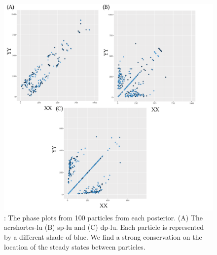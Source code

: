 \begin{figure}
	\begin{center}
		\includegraphics[width=\textwidth]{../../chapters/chapterStabilityFinder/images/LU-234-phase-all.png}
		\caption[Phase plots of multistable switches]{ \label{fig:lu_234_phase}: The phase plots from 100 particles from each posterior. (A) The \\acrshort{cs-lu} (B) \acrshort{sp-lu} and (C) \acrshort{dp-lu}. Each particle is represented by a different shade of blue. We find a strong conservation on the location of the steady states between particles.  }
	\end{center}
\end{figure}

\clearpage

